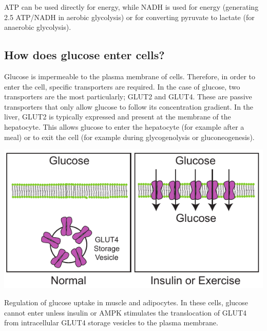 \documentclass{tufte-handout}
\begin{document}
ATP can be used directly for energy, while NADH is used for energy (generating 2.5 ATP/NADH in aerobic glycolysis) or for converting pyruvate to lactate (for anaerobic glycolysis).

\subsection{How does glucose enter cells?}

Glucose is impermeable to the plasma membrane of cells.  Therefore, in order to enter the cell, specific transporters are required.  In the case of glucose, two transporters are the most particularly;  GLUT2 and GLUT4.  These are passive transporters that only allow glucose to follow its concentration gradient.  In the liver, GLUT2 is typically expressed and present at the membrane of the hepatocyte.  This allows glucose to enter the hepatocyte (for example after a meal) or to exit the cell (for example during glycogenolysis or gluconeogenesis).

\begin{marginfigure}
\includegraphics{figures/GLUT4-Trafficking.pdf}
\caption{Regulation of glucose uptake in muscle and adipocytes.  In these cells, glucose cannot enter unless insulin or AMPK stimulates the translocation of GLUT4 from intracellular GLUT4 storage vesicles to the plasma membrane.}
\label{fig:GLUT4-Trafficking}
\end{marginfigure}
\end{document}
